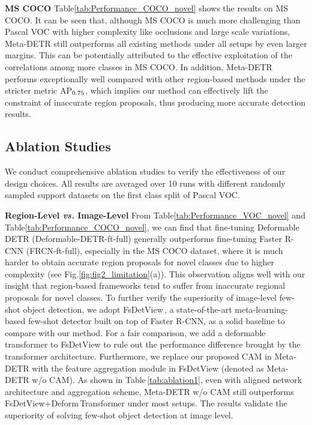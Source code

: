 \documentclass[letterpaper]{article} \usepackage{aaai22}  \usepackage{times}  \usepackage{helvet}  \usepackage{courier}  \usepackage[hyphens]{url}  \usepackage{graphicx} \urlstyle{rm} \def\UrlFont{\rm}  \usepackage{natbib}  \usepackage{caption} \DeclareCaptionStyle{ruled}{labelfont=normalfont,labelsep=colon,strut=off} \frenchspacing  \setlength{\pdfpagewidth}{8.5in}  \setlength{\pdfpageheight}{11in}  \usepackage{algorithm}
\begin{document}
\vspace{+0.5mm}
\smallskip
\noindent\textbf{MS COCO \;\;}
Table\;\ref{tab:Performance_COCO_novel} shows the results on MS COCO. It can be seen that, although MS COCO is much more challenging than Pascal VOC with higher complexity like occlusions and large scale variations, Meta-DETR still outperforms all existing methods under all setups by even larger margins. This can be potentially attributed to the effective exploitation of the correlations among more classes in MS COCO. In addition, Meta-DETR performs exceptionally well compared with other region-based methods under the stricter metric AP$_{\rm 0.75}$, which implies our method can effectively lift the constraint of inaccurate region proposals, thus producing more accurate detection results.



\subsection{Ablation Studies}

We conduct comprehensive ablation studies to verify the effectiveness of our design choices. All results are averaged over 10 runs with different randomly sampled support datasets on the first class split of Pascal VOC.

\vspace{+0.5mm}
\smallskip
\noindent\textbf{Region-Level \textit{vs.} Image-Level \;\;}
From Table\;\ref{tab:Performance_VOC_novel} and Table\;\ref{tab:Performance_COCO_novel}, we can find that fine-tuning Deformable DETR (Deformable-DETR-ft-full) generally outperforms fine-tuning Faster R-CNN (FRCN-ft-full), especially in the MS COCO dataset, where it is much harder to obtain accurate region proposals for novel classes due to higher complexity (see Fig.\;\ref{fig:fig2_limitation}(a)). This observation aligns well with our insight that region-based frameworks tend to suffer from inaccurate regional proposals for novel classes. To further verify the superiority of image-level few-shot object detection, we adopt FsDetView\,\cite{FSDetView}, a state-of-the-art meta-learning-based few-shot detector built on top of Faster R-CNN, as a solid baseline to compare with our method. For a fair comparison, we add a deformable transformer to FsDetView to rule out the performance difference brought by the transformer architecture. Furthermore, we replace our proposed CAM in Meta-DETR with the feature aggregation module in FsDetView (denoted as Meta-DETR w/o CAM). As shown in Table\,\ref{tab:ablation1}, even with aligned network architecture and aggregation scheme, Meta-DETR w/o CAM still outperforms FsDetView\;+\;Deform\,Transformer under most setups. The results validate the superiority of solving few-shot object detection at image level.
\end{document}
